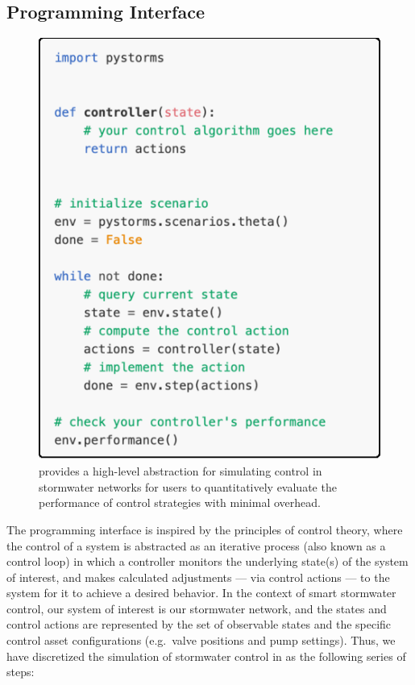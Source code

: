 \subsection{Programming Interface}
%
%
%
\begin{figure}[ht]
    \centering
	\includegraphics[width=0.9\linewidth]{gfx/Chapter-5/pystorms_code.eps}
	\caption{\pystorms provides a high-level abstraction for simulating control in stormwater networks for users to quantitatively evaluate the performance of control strategies with minimal overhead.}\label{fig:code}
\end{figure}
%
%
%
The \pystorms programming interface is inspired by the principles of control theory, where the control of a system is abstracted as an iterative process (also known as a control loop) in which a controller monitors the underlying state(s) of the system of interest, and makes calculated adjustments --- via control actions --- to the system for it to achieve a desired behavior. In the context of smart stormwater control, our system of interest is our stormwater network, and the states and control actions are represented by the set of observable states and the specific control asset configurations (e.g.\ valve positions and pump settings). Thus, we have discretized the simulation of stormwater control in \pystorms as the following series of steps:
